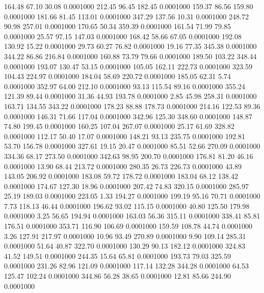  164.48   67.10   30.08   0.0001000
 212.45   96.45  182.45   0.0001000
 159.37   86.56  159.80   0.0001000
 181.66   81.45  113.01   0.0001000
 347.29  137.56   10.31   0.0001000
 248.72   90.98  257.01   0.0001000
 170.65   50.34  359.39   0.0001000
 161.54   71.99   79.85   0.0001000
  25.57   97.15  147.03   0.0001000
 168.42   58.66   67.05   0.0001000
 192.08  130.92   15.22   0.0001000
  29.73   60.27   76.82   0.0001000
  19.16   77.35  345.38   0.0001000
 344.22   86.86  216.84   0.0001000
 160.88   73.79   79.66   0.0001000
 189.50  103.22  348.44   0.0001000
 193.07  130.47   53.15   0.0001000
 105.05  162.11  222.73   0.0001000
 323.59  104.43  224.97   0.0001000
 184.04   58.69  220.72   0.0001000
 185.05   62.31    5.74   0.0001000
 352.97   64.00  212.10   0.0001000
  93.13  115.54   89.16   0.0001000
 355.24  121.39   89.44   0.0001000
  31.36   44.93  193.78   0.0001000
   2.85   45.98  258.31   0.0001000
 163.71  134.55  343.22   0.0001000
 178.23   88.88  178.73   0.0001000
 214.16  122.53   89.36   0.0001000
 146.31   71.66  117.04   0.0001000
 342.96  125.30  348.60   0.0001000
 148.87   74.80  199.45   0.0001000
 160.25  107.04  267.07   0.0001000
  25.17   61.69  328.82   0.0001000
 112.17   50.40   17.07   0.0001000
 148.21   93.13  235.75   0.0001000
 192.81   53.70  156.78   0.0001000
 327.61   19.15   20.47   0.0001000
  85.51   52.66  270.09   0.0001000
 334.36   68.17  273.50   0.0001000
 342.63   98.95  200.70   0.0001000
 176.81   81.20   46.16   0.0001000
  13.90   68.44  213.72   0.0001000
 280.35   26.73  226.73   0.0001000
  43.89  143.05  206.92   0.0001000
 183.08   59.72  178.72   0.0001000
 183.04   68.12  138.42   0.0001000
 174.67  127.30   18.96   0.0001000
 207.42   74.83  320.15   0.0001000
 285.97   25.19  189.03   0.0001000
 223.05    1.33  194.27   0.0001000
 199.19   95.16   70.71   0.0001000
   7.73  118.13   46.44   0.0001000
 196.62   93.02  115.15   0.0001000
  40.80  125.50  179.98   0.0001000
   3.25   56.65  194.94   0.0001000
 163.03   56.36  315.11   0.0001000
 338.41   85.81  176.51   0.0001000
 353.71  116.90  106.69   0.0001000
 159.59  108.78   44.74   0.0001000
   3.26  127.91  217.97   0.0001000
  10.96   93.49  270.89   0.0001000
   9.90  109.14  285.31   0.0001000
  51.64   40.87  322.70   0.0001000
 130.29   90.13  182.12   0.0001000
 324.83   41.52  149.51   0.0001000
 244.35   15.64   65.81   0.0001000
 193.73   79.03  325.59   0.0001000
 231.26   82.96  121.09   0.0001000
 117.14  132.28  344.28   0.0001000
  64.53  125.47  102.24   0.0001000
 344.86   56.28   38.65   0.0001000
  12.81   85.66  244.90   0.0001000
